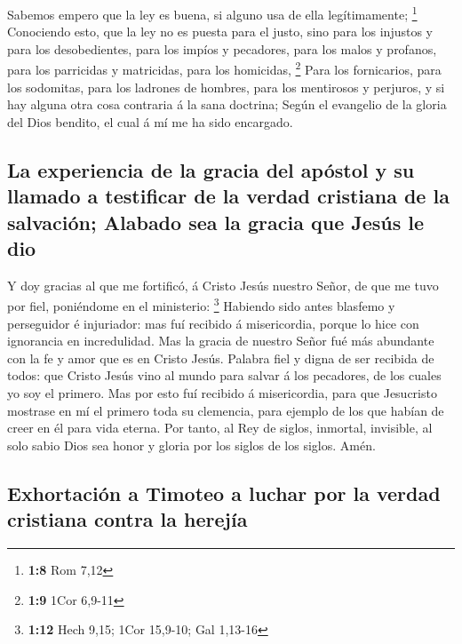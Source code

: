  Sabemos empero que la ley es buena, si alguno usa de ella
legítimamente; \footnote{\textbf{1:8} Rom 7,12} 
Conociendo esto, que la ley no es puesta para el justo, sino para los
injustos y para los desobedientes, para los impíos y pecadores, para los
malos y profanos, para los parricidas y matricidas, para los homicidas,
\footnote{\textbf{1:9} 1Cor 6,9-11}  Para los
fornicarios, para los sodomitas, para los ladrones de hombres, para los
mentirosos y perjuros, y si hay alguna otra cosa contraria á la sana
doctrina;  Según el evangelio de la gloria del Dios
bendito, el cual á mí me ha sido encargado.

\hypertarget{la-experiencia-de-la-gracia-del-apuxf3stol-y-su-llamado-a-testificar-de-la-verdad-cristiana-de-la-salvaciuxf3n-alabado-sea-la-gracia-que-jesuxfas-le-dio}{%
\subsection{La experiencia de la gracia del apóstol y su llamado a
testificar de la verdad cristiana de la salvación; Alabado sea la gracia
que Jesús le
dio}\label{la-experiencia-de-la-gracia-del-apuxf3stol-y-su-llamado-a-testificar-de-la-verdad-cristiana-de-la-salvaciuxf3n-alabado-sea-la-gracia-que-jesuxfas-le-dio}}

 Y doy gracias al que me fortificó, á Cristo Jesús
nuestro Señor, de que me tuvo por fiel, poniéndome en el ministerio:
\footnote{\textbf{1:12} Hech 9,15; 1Cor 15,9-10; Gal 1,13-16}
 Habiendo sido antes blasfemo y perseguidor é injuriador:
mas fuí recibido á misericordia, porque lo hice con ignorancia en
incredulidad.  Mas la gracia de nuestro Señor fué más
abundante con la fe y amor que es en Cristo Jesús. 
Palabra fiel y digna de ser recibida de todos: que Cristo Jesús vino al
mundo para salvar á los pecadores, de los cuales yo soy el primero.
 Mas por esto fuí recibido á misericordia, para que
Jesucristo mostrase en mí el primero toda su clemencia, para ejemplo de
los que habían de creer en él para vida eterna.  Por
tanto, al Rey de siglos, inmortal, invisible, al solo sabio Dios sea
honor y gloria por los siglos de los siglos. Amén.

\hypertarget{exhortaciuxf3n-a-timoteo-a-luchar-por-la-verdad-cristiana-contra-la-herejuxeda}{%
\subsection{Exhortación a Timoteo a luchar por la verdad cristiana
contra la
herejía}\label{exhortaciuxf3n-a-timoteo-a-luchar-por-la-verdad-cristiana-contra-la-herejuxeda}}

